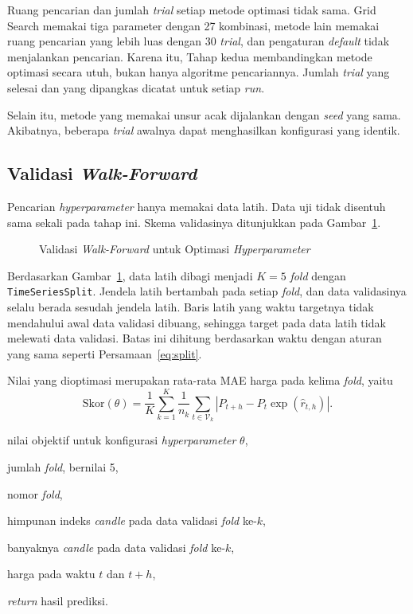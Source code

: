 Ruang pencarian dan jumlah \textit{trial} setiap metode optimasi tidak sama. Grid Search memakai
tiga parameter dengan 27 kombinasi, metode lain memakai ruang pencarian yang
lebih luas dengan 30 \textit{trial}, dan pengaturan \textit{default} tidak
menjalankan pencarian. Karena itu, Tahap kedua membandingkan metode optimasi secara utuh, bukan hanya
algoritme pencariannya. Jumlah \textit{trial} yang selesai dan yang dipangkas dicatat
untuk setiap \textit{run}.

Selain itu, metode yang memakai unsur acak dijalankan dengan \textit{seed}
yang sama. Akibatnya, beberapa \textit{trial} awalnya dapat menghasilkan
konfigurasi yang identik.

\subsection{Validasi \textit{Walk-Forward}}
Pencarian \textit{hyperparameter} hanya memakai data latih. Data uji tidak
disentuh sama sekali pada tahap ini. Skema validasinya ditunjukkan pada Gambar~\ref{fig:walk}.

\begin{figure}[!htbp]
  \centering
  \caption{Validasi \textit{Walk-Forward} untuk Optimasi
    \textit{Hyperparameter}}
  \label{fig:walk}
\end{figure}

Berdasarkan Gambar~\ref{fig:walk}, data latih dibagi menjadi $K = 5$ \textit{fold} dengan \texttt{TimeSeriesSplit}.
Jendela latih bertambah pada setiap \textit{fold}, dan data validasinya selalu
berada sesudah jendela latih. Baris latih yang waktu targetnya tidak
mendahului awal data validasi dibuang, sehingga target pada data latih tidak
melewati data validasi. Batas ini dihitung berdasarkan waktu dengan aturan
yang sama seperti Persamaan~\eqref{eq:split}.

Nilai yang dioptimasi merupakan rata-rata MAE harga pada kelima
\textit{fold}, yaitu
\begin{equation}
  \mathrm{Skor}(\theta) = \frac{1}{K}\sum_{k=1}^{K}
  \frac{1}{n_k}\sum_{t \in \mathcal{V}_k}
  \left\lvert P_{t+h} - P_t \exp\!\left(\hat{r}_{t,h}\right) \right\rvert .
  \label{eq:objektif}
\end{equation}
\begin{keterangan}
  \item[$\mathrm{Skor}(\theta)$] nilai objektif untuk konfigurasi
    \textit{hyperparameter} $\theta$,
  \item[$K$] jumlah \textit{fold}, bernilai 5,
  \item[$k$] nomor \textit{fold},
  \item[$\mathcal{V}_k$] himpunan indeks \textit{candle} pada data validasi
    \textit{fold} ke-$k$,
  \item[$n_k$] banyaknya \textit{candle} pada data validasi \textit{fold} ke-$k$,
  \item[$P_t$, $P_{t+h}$] harga pada waktu $t$ dan $t+h$,
  \item[$\hat{r}_{t,h}$] \textit{return} hasil prediksi.
\end{keterangan}

